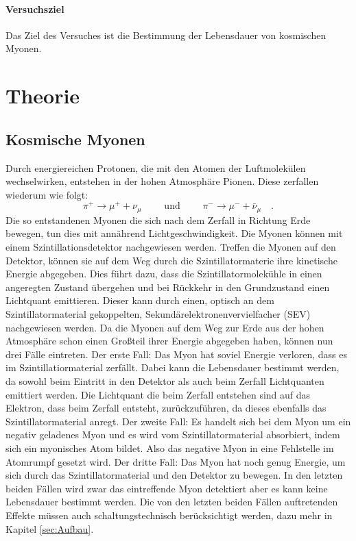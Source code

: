 \paragraph{Versuchsziel}
Das Ziel des Versuches ist die Bestimmung der Lebensdauer von kosmischen Myonen.

\section{Theorie}
\label{sec:Theorie}

\subsection{Kosmische Myonen}
Durch energiereichen Protonen, die mit den Atomen der Luftmolekülen wechselwirken, entstehen in der hohen 
Atmosphäre Pionen. Diese zerfallen wiederum wie folgt:
\begin{equation*} 
\pi^+ \to \mu^+ + \nu_{\mu} \qquad \text{ und } \qquad \pi^- \to \mu^- + \bar{\nu}_{\mu} \quad .
\end{equation*}
Die so entstandenen Myonen die sich nach dem Zerfall in Richtung Erde bewegen, tun dies mit annährend 
Lichtgeschwindigkeit. Die Myonen können mit einem Szintillationsdetektor nachgewiesen werden. 
Treffen die Myonen auf den Detektor, können sie auf dem  Weg durch die Szintillatormaterie ihre kinetische 
Energie abgegeben. Dies führt dazu, dass die Szintillatormolekühle in einen angeregten Zustand übergehen und bei 
Rückkehr in den Grundzustand einen Lichtquant emittieren. Dieser kann durch einen, optisch an dem 
Szintillatormaterial gekoppelten, Sekundärelektronenvervielfacher (SEV) nachgewiesen werden. Da die Myonen auf dem
Weg zur Erde aus der hohen Atmosphäre schon einen Großteil ihrer Energie abgegeben haben, können nun drei Fälle 
eintreten. Der erste Fall: Das Myon hat soviel Energie verloren, dass es im Szintillatiormaterial zerfällt. Dabei 
kann die Lebensdauer bestimmt werden, da sowohl beim Eintritt in den Detektor als auch beim Zerfall 
Lichtquanten 
emittiert werden. Die Lichtquant die beim Zerfall entstehen sind auf das Elektron, dass beim Zerfall entsteht, 
zurückzuführen, da dieses ebenfalls das Szintillatormaterial anregt. Der zweite Fall: Es handelt sich bei dem 
Myon um ein negativ geladenes Myon und es wird vom Szintillatormaterial absorbiert, indem sich ein 
myonisches Atom bildet. Also das negative Myon in eine Fehlstelle im Atomrumpf gesetzt wird. 
Der dritte Fall: Das 
Myon hat noch genug Energie, um sich durch das 
Szintillatormaterial und den Detektor zu bewegen. In den letzten beiden Fällen wird zwar das eintreffende Myon 
detektiert aber es kann keine Lebensdauer bestimmt werden. Die von den letzten beiden Fällen auftretenden 
Effekte müssen auch schaltungstechnisch berücksichtigt werden, dazu mehr in Kapitel \ref{sec:Aufbau}.
